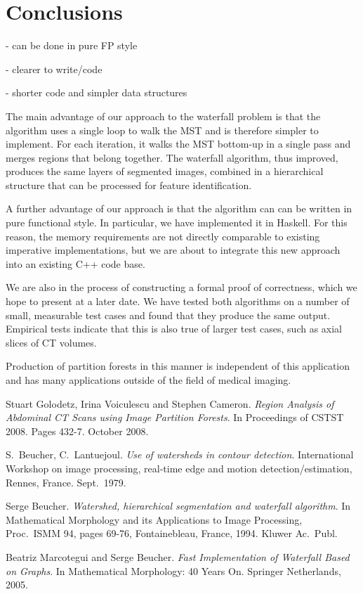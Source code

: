 \documentclass{jfp}
\begin{document}
\section{Conclusions}

 - can be done in pure FP style

 - clearer to write/code

 - shorter code and simpler data structures


The main advantage of our approach to the waterfall problem is that
the algorithm uses a single loop to walk the MST and is therefore
simpler to implement. For each iteration, it walks the MST bottom-up
in a single pass and merges regions that belong together. The
waterfall algorithm, thus improved, produces the same layers of
segmented images, combined in a hierarchical structure that can be
processed for feature identification.

A further advantage of our approach is that the algorithm can can be
written in pure functional style. In particular, we have implemented
it in Haskell. For this reason, the memory requirements are not
directly comparable to existing imperative implementations, but we are
about to integrate this new approach into an existing C++ code base.

We are also in the process of constructing a formal proof of
correctness, which we hope to present at a later date. We have tested
both algorithms on a number of small, measurable test cases and found
that they produce the same output. Empirical tests indicate that this
is also true of larger test cases, such as axial slices of CT volumes.

Production of partition forests in this manner is independent of this
application and has many applications outside of the field of medical
imaging.


\begin{thebibliography}{99}

 Stuart Golodetz, Irina Voiculescu
  and Stephen Cameron.  {\em Region Analysis of Abdominal CT Scans
    using Image Partition Forests}. In Proceedings of CSTST
  2008. Pages 432-7. October 2008.

 S.\ Beucher, C.\ Lantuejoul. {\em
  Use of watersheds in contour detection}. International Workshop on
  image processing, real-time edge and motion detection/estimation,
  Rennes, France. Sept.\ 1979.

 Serge Beucher. {\em Watershed,
  hierarchical segmentation and waterfall algorithm}. In Mathematical
  Morphology and its Applications to Image Processing, Proc.\ ISMM 94,
  pages 69-76, Fontainebleau, France, 1994. Kluwer Ac.\ Publ.

 Beatriz Marcotegui and Serge Beucher. {\em Fast
  Implementation of Waterfall Based on Graphs}. In {Mathematical
  Morphology: 40 Years On}. Springer Netherlands, 2005.

\end{thebibliography}
\end{document}
